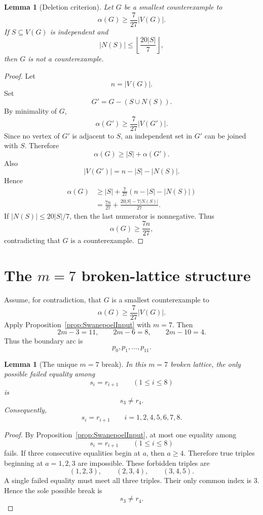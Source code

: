 \documentclass[11pt]{article}
\newtheorem{lemma}[theorem]{Lemma}
\begin{document}
\begin{lemma}[Deletion criterion]\label{lem:deletion}
Let $G$ be a smallest counterexample to
\[
 \alpha(G)\ge \frac{7}{27}|V(G)|.
\]
If $S\subseteq V(G)$ is independent and
\[
 |N(S)|\le \left\lfloor\frac{20|S|}{7}\right\rfloor,
\]
then $G$ is not a counterexample.
\end{lemma}

\begin{proof}
Let
\[
 n=|V(G)|.
\]
Set
\[
 G'=G-(S\cup N(S)).
\]
By minimality of $G$,
\[
 \alpha(G')\ge \frac{7}{27}|V(G')|.
\]
Since no vertex of $G'$ is adjacent to $S$, an independent set in $G'$ can be joined with $S$. Therefore
\[
 \alpha(G)\ge |S|+\alpha(G').
\]
Also
\[
 |V(G')|=n-|S|-|N(S)|.
\]
Hence
\[
\begin{aligned}
 \alpha(G)
 &\ge |S|+\frac{7}{27}(n-|S|-|N(S)|)\\
 &=\frac{7n}{27}+\frac{20|S|-7|N(S)|}{27}.
\end{aligned}
\]
If $|N(S)|\le 20|S|/7$, then the last numerator is nonnegative. Thus
\[
 \alpha(G)\ge \frac{7n}{27},
\]
contradicting that $G$ is a counterexample.
\end{proof}

\section{The $m=7$ broken-lattice structure}

Assume, for contradiction, that $G$ is a smallest counterexample to
\[
 \alpha(G)\ge \frac{7}{27}|V(G)|.
\]
Apply Proposition~\ref{prop:SwanepoelInput} with $m=7$. Then
\[
 2m-3=11,
 \qquad
 2m-6=8,
 \qquad
 2m-10=4.
\]
Thus the boundary arc is
\[
 p_0,p_1,\ldots,p_{11}.
\]

\begin{lemma}[The unique $m=7$ break]\label{lem:unique-break}
In this $m=7$ broken lattice, the only possible failed equality among
\[
 s_i=r_{i+1}\qquad(1\le i\le 8)
\]
is
\[
 s_3\ne r_4.
\]
Consequently,
\[
 s_i=r_{i+1}\qquad i=1,2,4,5,6,7,8.
\]
\end{lemma}

\begin{proof}
By Proposition~\ref{prop:SwanepoelInput}, at most one equality among
\[
 s_i=r_{i+1}\qquad(1\le i\le 8)
\]
fails. If three consecutive equalities begin at $a$, then $a\ge4$.
Therefore true triples beginning at $a=1,2,3$ are impossible. These forbidden triples are
\[
 (1,2,3),\qquad (2,3,4),\qquad (3,4,5).
\]
A single failed equality must meet all three triples. Their only common index is $3$. Hence the sole possible break is
\[
 s_3\ne r_4.
\]
\end{proof}
\end{document}

